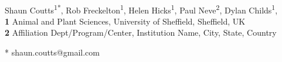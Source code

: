 \documentclass[10pt,letterpaper]{article}
\date{}
\begin{document}
\vspace*{0.2in}

\begin{flushleft}
{\Large
\textbf{} %
}
\newline
\\
Shaun Coutts\textsuperscript{1*},
Rob Freckelton\textsuperscript{1},
Helen Hicks\textsuperscript{1},
Paul Neve\textsuperscript{2},
Dylan Childs\textsuperscript{1},
\\
\bigskip
\textbf{1} Animal and Plant Sciences, University of Sheffield, Sheffield, UK
\\
\textbf{2} Affiliation Dept/Program/Center, Institution Name, City, State, Country
\\
\bigskip

% 
%





* shaun.coutts@gmail.com

\end{flushleft}
\end{document}
